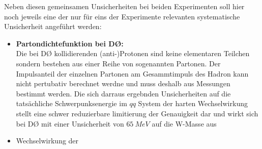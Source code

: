 \documentclass[a4paper,12pt]{article}
\begin{document}
Neben diesen gemeinsamen Unsicherheiten bei beiden Experimenten soll hier noch jeweils eine der nur für eins der Experimente relevanten
systematische Unsicherheit angeführt werden:
\begin{itemize}
	\item \textbf{Partondichtefunktion bei DØ:}\\
	Die bei DØ kollidierenden (anti-)Protonen sind keine elementaren Teilchen sondern bestehen aus einer Reihe von sogenannten Partonen. Der
	Impulsanteil der einzelnen Partonen am Gesammtimpuls des Hadron kann nicht pertubativ berechnet werdne und muss deshalb aus Messungen bestimmt
	werden. Die sich darraus ergebnden Unsicherheiten auf die tatsächliche Schwerpunksenergie im $qq$ System der harten Wechselwirkung stellt eine
	schwer reduzierbare limitierung der Genauigkeit dar und wirkt sich bei DØ mit einer Unsicherheit von $\SI{65}{MeV}$ auf die W-Masse aus
	\item {Wechselwirkung der }
\end{itemize} 



{}
\end{document}
